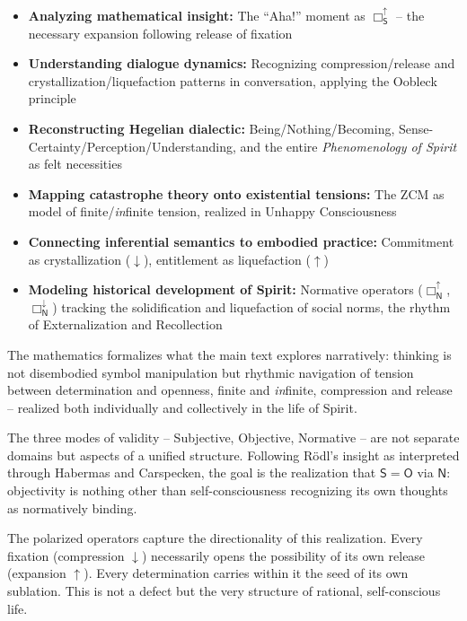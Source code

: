 \documentclass[12pt]{book}
\begin{document}
\begin{itemize}
\item \textbf{Analyzing mathematical insight:} The ``Aha!'' moment as $\Box_{\mathsf{S}}^{\uparrow}$ -- the necessary expansion following release of fixation
\item \textbf{Understanding dialogue dynamics:} Recognizing compression/release and crystallization/liquefaction patterns in conversation, applying the Oobleck principle
\item \textbf{Reconstructing Hegelian dialectic:} Being/Nothing/Becoming, Sense-Certainty/Perception/Understanding, and the entire \emph{Phenomenology of Spirit} as felt necessities
\item \textbf{Mapping catastrophe theory onto existential tensions:} The ZCM as model of finite/\textit{in}finite tension, realized in Unhappy Consciousness
\item \textbf{Connecting inferential semantics to embodied practice:} Commitment as crystallization ($\downarrow$), entitlement as liquefaction ($\uparrow$)
\item \textbf{Modeling historical development of Spirit:} Normative operators ($\Box_{\mathsf{N}}^{\uparrow}$, $\Box_{\mathsf{N}}^{\downarrow}$) tracking the solidification and liquefaction of social norms, the rhythm of Externalization and Recollection
\end{itemize}

The mathematics formalizes what the main text explores narratively: thinking is not disembodied symbol manipulation but rhythmic navigation of tension between determination and openness, finite and \textit{in}finite, compression and release -- realized both individually and collectively in the life of Spirit.

The three modes of validity -- Subjective, Objective, Normative -- are not separate domains but aspects of a unified structure. Following Rödl's insight as interpreted through Habermas and Carspecken, the goal is the realization that $\mathsf{S} = \mathsf{O}$ via $\mathsf{N}$: objectivity is nothing other than self-consciousness recognizing its own thoughts as normatively binding.

The polarized operators capture the directionality of this realization. Every fixation (compression $\downarrow$) necessarily opens the possibility of its own release (expansion $\uparrow$). Every determination carries within it the seed of its own sublation. This is not a defect but the very structure of rational, self-conscious life.
\end{document}
